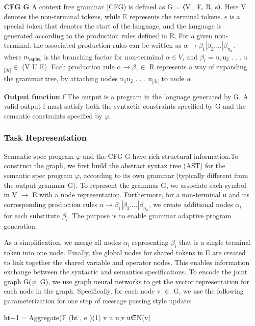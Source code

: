 \documentclass{article}
\begin{document}
\textbf{CFG G} A context free grammar (CFG) is defined as G = ⟨V , E, R, s⟩. Here V denotes the non-terminal tokens, while E represents the terminal tokens. s is a special token that denotes the start of the language, and the language is generated according to the production rules defined in R. For a given non-terminal, the associated production rules can be written as $\alpha \rightarrow \beta_1 | \beta_2 .... | \beta_{n_\alpha}$, where ${n_\apha}$ is the branching factor for non-terminal $\alpha \in V$, and $\beta _i$ = u$_1$u$_2$ . . . u$_{|βi|} \in$  (V U E). Each production rule $\alpha \rightarrow \beta_1 \in$ R represents a way of expanding the grammar tree, by attaching nodes u$_1$u$_2$ . . . u$_{|βi|}$ to node $\alpha$.

\textbf{Output function f} The output is a program in the language generated by G. A valid output f must satisfy both the syntactic constraints specified by G and the semantic constraints specified by $\varphi$.

\subsubsection{Task Representation}
Semantic spec program $\varphi$ and the CFG G have rich structural information.To construct the graph, we first build the abstract syntax tree (AST) for the semantic spec program $\varphi$, according to its own grammar (typically different from the output grammar G). To represent the grammar G, we associate each symbol in V $\rightarrow$ E with a node representation. Furthermore, for a non-terminal α and its corresponding production rules  $\alpha \rightarrow \beta_1 | \beta_2 .... | \beta_{n_\alpha}$, we create additional nodes $\alpha_i$ for each substitute $\beta_i$. The purpose is to enable grammar adaptive program generation.

As a simplification, we merge all nodes $\alpha_i$ representing $\beta_i$ that is a single terminal token into one node. Finally, the global nodes for shared tokens in E are created to link together the shared variable and operator nodes. This enables information exchange between the syntactic and semantics specifications. To encode the joint graph G($\varphi$, G), we use graph neural networks to get the vector representation for each node in the graph. Specifically, for each node v $\in$ G, we use the following parameterization for one step of message passing style update:

ht+1 = Aggregate({F (ht , e )}(1) v u u,v u∈N(v)
\end{document}

